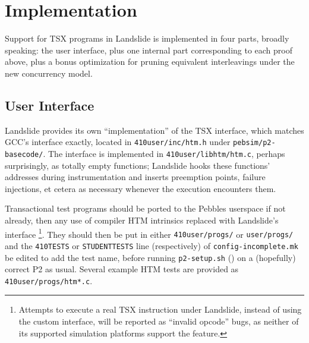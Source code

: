 
\section{Implementation}

Support for TSX programs in Landslide is implemented in four parts, broadly speaking:
the user interface,
plus one internal part corresponding to each proof above,
plus a bonus optimization for pruning equivalent interleavings under the new concurrency model.

\subsection{User Interface}

Landslide provides its own ``implementation'' of the TSX interface,
which matches GCC's interface exactly,
located in {\tt 410user/inc/htm.h}
under {\tt pebsim/p2-basecode/}.
The interface is implemented in {\tt 410user/libhtm/htm.c},
perhaps surprisingly, as totally empty functions;
Landslide hooks these functions' addresses during instrumentation
and inserts preemption points, failure injections,
et cetera as necessary whenever the execution encounters them.

Transactional test programs should be ported to the Pebbles userspace if not already,
then any use of compiler HTM intrinsics replaced with Landslide's interface%
\footnote{Attempts to execute a real TSX instruction under Landslide, instead of using the custom interface,
will be reported as ``invalid opcode'' bugs,
as neither of its supported simulation platforms support the feature.
}.
They should then be put in either {\tt 410user/progs/} or {\tt user/progs/}
and the {\tt 410TESTS} or {\tt STUDENTTESTS} line (respectively) of {\tt config-incomplete.mk} be edited to add the test name,
before running {\tt p2-setup.sh} (\sect{\ref{sec:landslide-setup}})
on a (hopefully) correct P2 as usual.
Several example HTM tests are provided as {\tt 410user/progs/htm*.c}.

